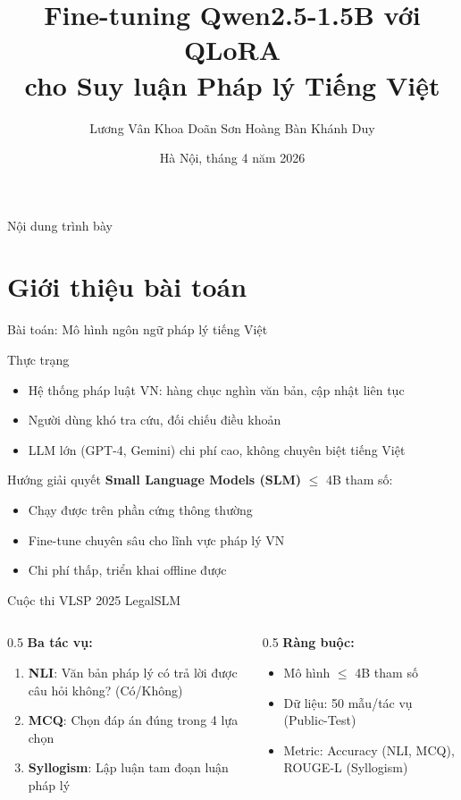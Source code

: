 \documentclass{beamer}
\title[LegalSLM --- QLoRA]{Fine-tuning Qwen2.5-1.5B với QLoRA\\
       cho Suy luận Pháp lý Tiếng Việt}
\author[Lương, Hoàng, Duy]{Lương Vân Khoa \quad Doãn Sơn Hoàng \quad Bàn Khánh Duy}
\institute[HUS -- VNU]{Khoa Toán -- Cơ -- Tin học\\
                        Trường ĐH Khoa học Tự nhiên, ĐHQGHN}
\date[2026]{Hà Nội, tháng 4 năm 2026}
\begin{document}
\frame[plain]{\titlepage}
\setcounter{framenumber}{0}

\begin{frame}{Nội dung trình bày}
  \tableofcontents
\end{frame}

\section{Giới thiệu bài toán}

\begin{frame}{Bài toán: Mô hình ngôn ngữ pháp lý tiếng Việt}
  \begin{block}{Thực trạng}
    \begin{itemize}
      \item Hệ thống pháp luật VN: hàng chục nghìn văn bản, cập nhật liên tục
      \item Người dùng khó tra cứu, đối chiếu điều khoản
      \item LLM lớn (GPT-4, Gemini) chi phí cao, không chuyên biệt tiếng Việt
    \end{itemize}
  \end{block}
  \begin{block}{Hướng giải quyết}
    \textbf{Small Language Models (SLM)} $\leq$ 4B tham số:
    \begin{itemize}
      \item Chạy được trên phần cứng thông thường
      \item Fine-tune chuyên sâu cho lĩnh vực pháp lý VN
      \item Chi phí thấp, triển khai offline được
    \end{itemize}
  \end{block}
\end{frame}

\begin{frame}{Cuộc thi VLSP 2025 LegalSLM}
  \begin{columns}
    \begin{column}{0.5\textwidth}
      \textbf{Ba tác vụ:}
      \begin{enumerate}
        \item \textbf{NLI}: Văn bản pháp lý có trả lời được câu hỏi không? (Có/Không)
        \item \textbf{MCQ}: Chọn đáp án đúng trong 4 lựa chọn
        \item \textbf{Syllogism}: Lập luận tam đoạn luận pháp lý
      \end{enumerate}
    \end{column}
    \begin{column}{0.5\textwidth}
      \textbf{Ràng buộc:}
      \begin{itemize}
        \item Mô hình $\leq$ 4B tham số
        \item Dữ liệu: 50 mẫu/tác vụ (Public-Test)
        \item Metric: Accuracy (NLI, MCQ), ROUGE-L (Syllogism)
      \end{itemize}
    \end{column}
  \end{columns}
\end{frame}
\end{document}
